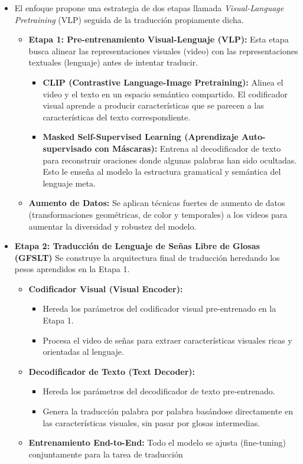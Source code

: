 \documentclass[11pt,a4paper]{article}
\begin{document}
\begin{itemize}
	\item El enfoque propone una estrategia de dos etapas llamada \emph{Visual-Language Pretraining} (VLP) seguida de la traducción propiamente dicha.
	\begin{itemize}
		\item \textbf{Etapa 1: Pre-entrenamiento Visual-Lenguaje (VLP):} Esta etapa busca alinear las representaciones visuales (video) con las representaciones textuales (lenguaje) antes de intentar traducir.
		\begin{itemize}
			\item\textbf{ CLIP (Contrastive Language-Image Pretraining):} Alinea el video y el texto en un espacio semántico compartido. El codificador visual aprende a producir características que se parecen a las características del texto correspondiente.
			\item \textbf{Masked Self-Supervised Learning (Aprendizaje Auto-supervisado con Máscaras):} Entrena al decodificador de texto para reconstruir oraciones donde algunas palabras han sido ocultadas. Esto le enseña al modelo la estructura gramatical y semántica del lenguaje meta.
		\end{itemize}
		\item \textbf{Aumento de Datos:} Se aplican técnicas fuertes de aumento de datos (transformaciones geométricas, de color y temporales) a los videos para aumentar la diversidad y robustez del modelo.
	\end{itemize}
	\item \textbf{Etapa 2: Traducción de Lenguaje de Señas Libre de Glosas (GFSLT)} Se construye la arquitectura final de traducción heredando los pesos aprendidos en la Etapa 1.
	\begin{itemize}
		\item \textbf{Codificador Visual (Visual Encoder):} 
		\begin{itemize}
			\item Hereda los parámetros del codificador visual pre-entrenado en la Etapa 1.
			\item Procesa el video de señas para extraer características visuales ricas y orientadas al lenguaje.
		\end{itemize}
		\item \textbf{Decodificador de Texto (Text Decoder):}
		\begin{itemize}
			\item Hereda los parámetros del decodificador de texto pre-entrenado.	
			\item Genera la traducción palabra por palabra basándose directamente en las características visuales, sin pasar por glosas intermedias.	
		\end{itemize}
		\item \textbf{Entrenamiento End-to-End:} Todo el modelo se ajusta (fine-tuning) conjuntamente para la tarea de traducción
	\end{itemize}
\end{itemize}
\end{document}

